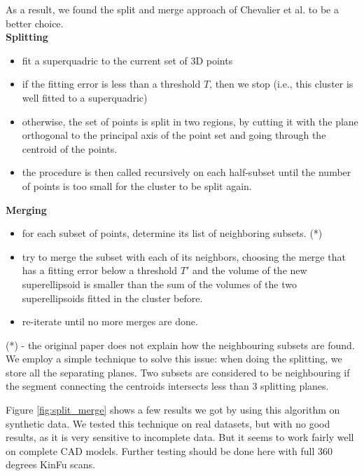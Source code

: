\documentclass{article}
\begin{document}
As a result, we found the split and merge approach of Chevalier et al. \cite{conf/wscg/ChevalierJB03} to be a better choice. \\

\textbf{Splitting}
\begin{itemize}
	\item {fit a superquadric to the current set of 3D points}
	\item {if the fitting error is less than a threshold $T$, then we stop (i.e., this cluster is well fitted to a superquadric)}
	\item {otherwise, the set of points is split in two regions, by cutting it with the plane orthogonal to the principal axis of the point set and going through the centroid of the points.}
	\item {the procedure is then called recursively on each half-subset until the number of points is too small for the cluster to be split again.}
\end{itemize}

\textbf{Merging}
\begin{itemize}
	\item {for each subset of points, determine its list of neighboring subsets. (*)}
	\item {try to merge the subset with each of its neighbors, choosing the merge that has a fitting error below a threshold $T'$ and the volume of the new superellipsoid is smaller than the sum of the volumes of the two superellipsoids fitted in the cluster before.}
	\item {re-iterate until no more merges are done.}
\end{itemize}

(*) - the original paper does not explain how the neighbouring subsets are found. We employ a simple technique to solve this issue: when doing the splitting, we store all the separating planes. Two subsets are considered to be neighbouring if the segment connecting the centroids intersects less than 3 splitting planes.

Figure \ref{fig:split_merge} shows a few results we got by using this algorithm on synthetic data. We tested this technique on real datasets, but with no good results, as it is very sensitive to incomplete data. But it seems to work fairly well on complete CAD models. Further testing should be done here with full 360 degrees KinFu scans.
\end{document}
